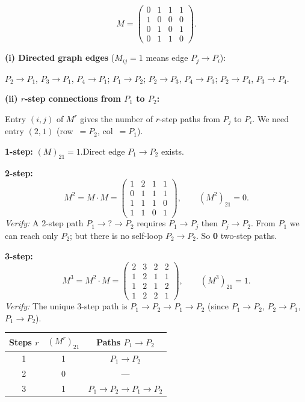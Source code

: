 \documentclass[12pt,a3paper]{article}
\begin{document}
\begin{tcolorbox}[enhanced,breakable,
  colback=cA!4,colframe=cA,boxrule=0.8pt,arc=5pt,
  title={\textbf{Answer --- Directed Graph $M$; $r$-Step Connections $P_1\to P_2$}},
  fonttitle=\bfseries\color{white},colbacktitle=cA]

\[
M = \begin{pmatrix}0&1&1&1\\1&0&0&0\\0&1&0&1\\0&1&1&0\end{pmatrix}.
\]

\textbf{(i) Directed graph edges} ($M_{ij}=1$ means edge $P_j\to P_i$):

$P_2\to P_1$,\; $P_3\to P_1$,\; $P_4\to P_1$;\quad
$P_1\to P_2$;\quad
$P_2\to P_3$,\; $P_4\to P_3$;\quad
$P_2\to P_4$,\; $P_3\to P_4$.

\medskip
\textbf{(ii) $r$-step connections from $P_1$ to $P_2$:}

Entry $(i,j)$ of $M^r$ gives the number of $r$-step paths from $P_j$ to $P_i$.
We need entry $(2,1)$ (row~$=P_2$, col~$=P_1$).

\medskip
\textbf{1-step:} $(M)_{21} = 1$.\quad Direct edge $P_1\to P_2$ exists.\;\checkmark

\medskip
\textbf{2-step:}
\[
M^2 = M\cdot M =
\begin{pmatrix}1&2&1&1\\0&1&1&1\\1&1&1&0\\1&1&0&1\end{pmatrix},
\qquad (M^2)_{21} = 0.
\]
\textit{Verify:} A 2-step path $P_1\to?\to P_2$ requires $P_1\to P_j$ then $P_j\to P_2$.
From $P_1$ we can reach only $P_2$; but there is no self-loop $P_2\to P_2$.
So \textbf{0} two-step paths.\;\checkmark

\medskip
\textbf{3-step:}
\[
M^3 = M^2\cdot M =
\begin{pmatrix}2&3&2&2\\1&2&1&1\\1&2&1&2\\1&2&2&1\end{pmatrix},
\qquad (M^3)_{21} = 1.
\]
\textit{Verify:} The unique 3-step path is $P_1\to P_2\to P_1\to P_2$
(since $P_1\to P_2$\;\checkmark,\; $P_2\to P_1$\;\checkmark,\; $P_1\to P_2$\;\checkmark).\;\checkmark

\medskip
\begin{center}
\small
\begin{tabular}{@{}ccc@{}}
\toprule
\textbf{Steps $r$} & \textbf{$(M^r)_{21}$} & \textbf{Paths $P_1\to P_2$} \\
\midrule
1 & 1 & $P_1\to P_2$ \\
2 & 0 & --- \\
3 & 1 & $P_1\to P_2\to P_1\to P_2$ \\
\bottomrule
\end{tabular}
\end{center}

\end{tcolorbox}
\end{document}
